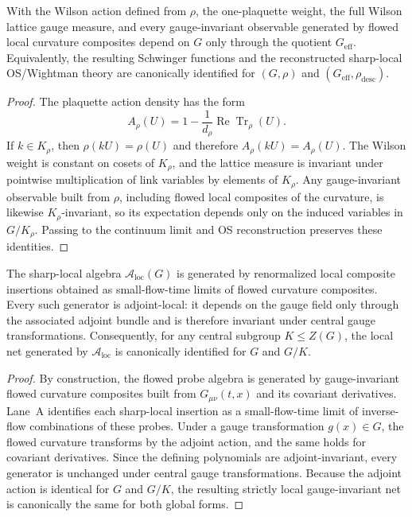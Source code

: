 \begin{lemma}\label{lem:center-blindness}
With the Wilson action defined from $\rho$, the one-plaquette weight, the full Wilson lattice gauge measure, and every gauge-invariant observable generated by flowed local curvature composites depend on $G$ only through the quotient $G_{\mathrm{eff}}$. Equivalently, the resulting Schwinger functions and the reconstructed sharp-local OS/Wightman theory are canonically identified for $(G,\rho)$ and $(G_{\mathrm{eff}},\rho_{\mathrm{desc}})$.
\end{lemma}

\begin{proof}
The plaquette action density has the form
\[
  A_\rho(U)=1-\frac{1}{d_\rho}\operatorname{Re}\operatorname{Tr}_\rho(U).
\]
If $k\in K_\rho$, then $\rho(kU)=\rho(U)$ and therefore $A_\rho(kU)=A_\rho(U)$. The Wilson weight is constant on cosets of $K_\rho$, and the lattice measure is invariant under pointwise multiplication of link variables by elements of $K_\rho$. Any gauge-invariant observable built from $\rho$, including flowed local composites of the curvature, is likewise $K_\rho$-invariant, so its expectation depends only on the induced variables in $G/K_\rho$. Passing to the continuum limit and OS reconstruction preserves these identities.
\end{proof}

\begin{lemma}\label{lem:adjoint-local}
The sharp-local algebra $\mathcal A_{\mathrm{loc}}(G)$ is generated by renormalized local composite insertions obtained as small-flow-time limits of flowed curvature composites. Every such generator is adjoint-local: it depends on the gauge field only through the associated adjoint bundle and is therefore invariant under central gauge transformations. Consequently, for any central subgroup $K\leq Z(G)$, the local net generated by $\mathcal A_{\mathrm{loc}}$ is canonically identified for $G$ and $G/K$.
\end{lemma}

\begin{proof}
By construction, the flowed probe algebra is generated by gauge-invariant flowed curvature composites built from $G_{\mu\nu}(t,x)$ and its covariant derivatives. Lane~A identifies each sharp-local insertion as a small-flow-time limit of inverse-flow combinations of these probes. Under a gauge transformation $g(x)\in G$, the flowed curvature transforms by the adjoint action, and the same holds for covariant derivatives. Since the defining polynomials are adjoint-invariant, every generator is unchanged under central gauge transformations. Because the adjoint action is identical for $G$ and $G/K$, the resulting strictly local gauge-invariant net is canonically the same for both global forms.
\end{proof}

